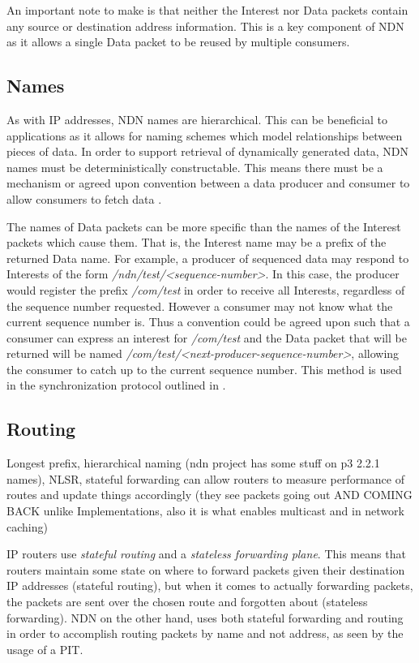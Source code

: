 An important note to make is that neither the Interest nor Data packets contain any source or destination address information. This is a key component of NDN as it allows a single Data packet to be reused by multiple consumers. 

\subsection{Names}\label{sec:ndn-names}
As with IP addresses, NDN names are hierarchical. This can be beneficial to applications as it allows for naming schemes which model relationships between pieces of data. In order to support retrieval of dynamically generated data, NDN names must be deterministically constructable. This means there must be a mechanism or agreed upon convention between a data producer and consumer to allow consumers to fetch data \cite{ndn-project}. 

The names of Data packets can be more specific than the names of the Interest packets which cause them. That is, the Interest name may be a prefix of the returned Data name. For example, a producer of sequenced data may respond to Interests of the form \textit{/ndn/test/<sequence-number>}.  In this case, the producer would register the prefix \textit{/com/test} in order to receive all Interests, regardless of the sequence number requested. However a consumer may not know what the current sequence number is. Thus a convention could be agreed upon such that a consumer can express an interest for \textit{/com/test} and the Data packet that will be returned will be named \textit{/com/test/<next-producer-sequence-number>}, allowing the consumer to catch up to the current sequence number. This method is used in the synchronization protocol outlined in .

\subsection{Routing}
Longest prefix, hierarchical naming (ndn project has some stuff on p3 2.2.1 names), NLSR, stateful forwarding can allow routers to measure performance of routes and update things accordingly (they see packets going out AND COMING BACK unlike Implementations, also it is what enables multicast and in network caching)

IP routers use \textit{stateful routing} and a \textit{stateless forwarding plane}. This means that routers maintain some state on where to forward packets given their destination IP addresses (stateful routing), but when it comes to actually forwarding packets, the packets are sent over the chosen route and forgotten about (stateless forwarding). NDN on the other hand, uses both stateful forwarding and routing \cite{stateful-forwarding} in order to accomplish routing packets by name and not address, as seen by the usage of a PIT. 

